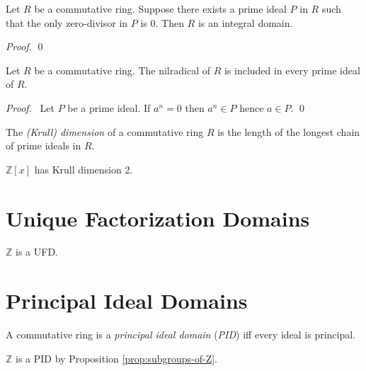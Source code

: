 \begin{prop}
Let $R$ be a commutative ring. Suppose there exists a prime ideal $P$ in $R$ such that the only zero-divisor in $P$ is 0. Then $R$ is an integral domain.
\end{prop}

\begin{proof}
\pf
{}
\qed
\end{proof}

\begin{prop}
Let $R$ be a commutative ring. The nilradical of $R$ is included in every prime ideal of $R$.
\end{prop}

\begin{proof}
\pf\ Let $P$ be a prime ideal. If $a^n = 0$ then $a^n \in P$ hence $a \in P$. \qed
\end{proof}


\begin{df}
The \emph{(Krull) dimension} of a commutative ring $R$ is the length of the longest chain of prime ideals in $R$.
\end{df}

\begin{ex}
$\mathbb{Z}[x]$ has Krull dimension 2. %
\end{ex}

\chapter{Unique Factorization Domains}


\begin{ex}
$\mathbb{Z}$ is a UFD.
\end{ex}

\chapter{Principal Ideal Domains}

\begin{df}
A commutative ring is a \emph{principal ideal domain} (\emph{PID}) iff every ideal is principal.
\end{df}

\begin{ex}
$\mathbb{Z}$ is a PID by Proposition \ref{prop:subgroups-of-Z}.
\end{ex}

